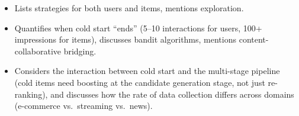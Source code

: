 \begin{interviewq}

\goodgreat
\begin{itemize}
    \item {} Lists strategies for both users and items, mentions exploration.
    \item {} Quantifies when cold start ``ends'' (5--10 interactions for users, 100+ impressions for items), discusses bandit algorithms, mentions content-collaborative bridging.
    \item {} Considers the interaction between cold start and the multi-stage pipeline (cold items need boosting at the candidate generation stage, not just re-ranking), and discusses how the rate of data collection differs across domains (e-commerce vs.\ streaming vs.\ news).
\end{itemize}

\end{interviewq}

